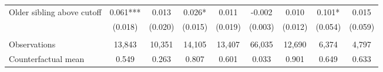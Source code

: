 {{\begin{tabular}{lcccccccc}
Older sibling above cutoff&       0.061***&       0.013   &       0.026*  &       0.011   &      -0.002   &       0.010   &       0.101*  &       0.015   \\
                    &     (0.018)   &     (0.020)   &     (0.015)   &     (0.019)   &     (0.003)   &     (0.012)   &     (0.054)   &     (0.059)   \\
                    &               &               &               &               &               &               &               &               \\
Observations        &      13,843   &      10,351   &      14,105   &      13,407   &      66,035   &      12,690   &       6,374   &       4,797   \\
Counterfactual mean &       0.549   &       0.263   &       0.807   &       0.601   &       0.033   &       0.901   &       0.649   &       0.633   \\
 

\bottomrule
\end{tabular}
}
}
